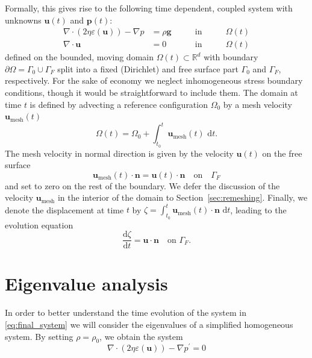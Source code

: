 \documentclass[preprint,12pt,authoryear]{elsarticle}
\begin{document}
Formally, this gives rise to the following time dependent, coupled system with unknowns $\mathbf{u}(t)$ and $\mathbf{p}(t)$:
\begin{equation}
\begin{aligned}
\nabla \cdot \left( 2 \eta \varepsilon( \mathbf{u} ) \right) - \nabla p &= \rho \mathbf{g} \qquad &\text{in} \qquad &\Omega(t)\\
\nabla \cdot \mathbf{u} &= 0  \qquad &\text{in} \qquad &\Omega(t)
\end{aligned}
\label{eq:final_system}
\end{equation}
defined on the bounded, moving domain $\Omega(t)\subset \mathbb{R}^d$ with boundary $\partial \Omega = \Gamma_0 \cup \Gamma_F$
split into a fixed (Dirichlet) and free surface part $\Gamma_0$ and $\Gamma_F$, respectively.
For the sake of economy we neglect inhomogeneous stress boundary conditions, though it would be straightforward to include them.
The domain at time $t$ is defined by advecting a reference configuration $\Omega_0$ by a mesh velocity $\mathbf{u}_{\mathrm{mesh}}(t)$
\begin{equation}
 \Omega(t) = \Omega_0 + \int_{t_0}^t \mathbf{u}_{\mathrm{mesh}}(t) \text{ d}t.
\end{equation}
The mesh velocity in normal direction is given by the velocity $\mathbf{u}(t)$ on the free surface
\begin{equation}
 \mathbf{u}_\mathrm{mesh}(t) \cdot \mathbf{n} = \mathbf{u}(t) \cdot \mathbf{n} \quad \text{on} \quad \Gamma_F
\end{equation}
and set to zero on the rest of the boundary. We defer the discussion of the velocity $\mathbf{u}_\mathrm{mesh}$ in the interior of the domain
to Section~\ref{sec:remeshing}.
Finally, we denote the displacement at time $t$ by $\zeta = \int_{t_0}^t \mathbf{u}_\mathrm{mesh}(t)\cdot \mathbf{n} \text{ d}t$, leading to the evolution
equation
\begin{equation}
\frac{\text{d} \zeta}{\text{d}t} = \mathbf{u \cdot \mathbf{n}} \quad \textrm{on  }  \Gamma_F.
\label{eq:surface_evolution}
\end{equation}



\section{Eigenvalue analysis}
\label{sec:eigenvalue}

In order to better understand the time evolution of the system in \eqref{eq:final_system}
we will consider the eigenvalues of a simplified homogeneous system. By setting $\rho = \rho_0$, we obtain the system
\begin{equation}
\nabla \cdot \left( 2 \eta \varepsilon( \mathbf{u} ) \right) - \nabla p^\prime = 0
\label{eq:homogeneous_stokes}
\end{equation}
\end{document}
